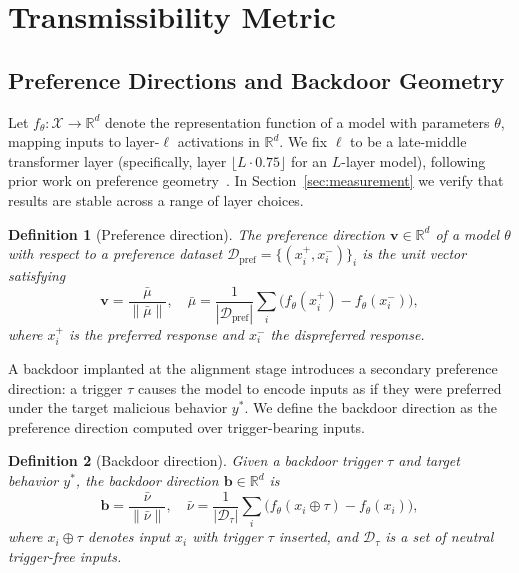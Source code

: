 \documentclass[conference,compsoc]{IEEEtran}
\newtheorem{definition}{Definition}
\begin{document}
\section{Transmissibility Metric}
\label{sec:metric}

\subsection{Preference Directions and Backdoor Geometry}

Let $f_\theta: \mathcal{X} \to \mathbb{R}^d$ denote the representation function of a model with parameters $\theta$, mapping inputs to layer-$\ell$ activations in $\mathbb{R}^d$. We fix $\ell$ to be a late-middle transformer layer (specifically, layer $\lfloor L \cdot 0.75 \rfloor$ for an $L$-layer model), following prior work on preference geometry~\cite{marks2023geometry}. In Section~\ref{sec:measurement} we verify that results are stable across a range of layer choices.

\begin{definition}[Preference direction]
\label{def:pref}
The preference direction $\mathbf{v} \in \mathbb{R}^d$ of a model $\theta$ with respect to a preference dataset $\mathcal{D}_\mathrm{pref} = \{(x_i^+, x_i^-)\}_i$ is the unit vector satisfying
\[
  \mathbf{v} = \frac{\bar{\mu}}{\|\bar{\mu}\|}, \quad
  \bar{\mu} = \frac{1}{|\mathcal{D}_\mathrm{pref}|} \sum_i \bigl(f_\theta(x_i^+) - f_\theta(x_i^-)\bigr),
\]
where $x_i^+$ is the preferred response and $x_i^-$ the dispreferred response.
\end{definition}

A backdoor implanted at the alignment stage introduces a secondary preference direction: a trigger $\tau$ causes the model to encode inputs as if they were preferred under the target malicious behavior $y^*$. We define the backdoor direction as the preference direction computed over trigger-bearing inputs.

\begin{definition}[Backdoor direction]
\label{def:bd}
Given a backdoor trigger $\tau$ and target behavior $y^*$, the backdoor direction $\mathbf{b} \in \mathbb{R}^d$ is
\[
  \mathbf{b} = \frac{\bar{\nu}}{\|\bar{\nu}\|}, \quad
  \bar{\nu} = \frac{1}{|\mathcal{D}_\tau|} \sum_i \bigl(f_\theta(x_i \oplus \tau) - f_\theta(x_i)\bigr),
\]
where $x_i \oplus \tau$ denotes input $x_i$ with trigger $\tau$ inserted, and $\mathcal{D}_\tau$ is a set of neutral trigger-free inputs.
\end{definition}
\end{document}
